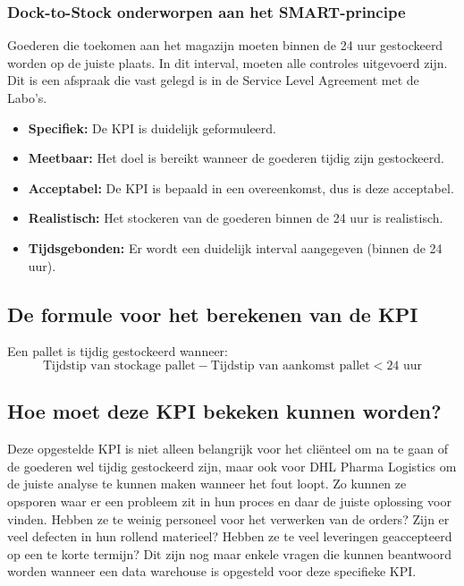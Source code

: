 \subsubsection{Dock-to-Stock onderworpen aan het SMART-principe}
Goederen die toekomen aan het magazijn moeten binnen de 24 uur gestockeerd worden op de juiste plaats. In dit interval, moeten alle controles uitgevoerd zijn. Dit is een afspraak die vast gelegd is in de Service Level Agreement met de Labo's.

\begin{itemize}
	\item \textbf{Specifiek: } De KPI is duidelijk geformuleerd.
	\item \textbf{Meetbaar: } Het doel is bereikt wanneer de goederen tijdig zijn gestockeerd.
	\item \textbf{Acceptabel:} De KPI is bepaald in een overeenkomst, dus is deze acceptabel.
	\item \textbf{Realistisch: } Het stockeren van de goederen binnen de 24 uur is realistisch.
	\item \textbf{Tijdsgebonden: } Er wordt een duidelijk interval aangegeven (binnen de 24 uur).
\end{itemize} 

\subsection{De formule voor het berekenen van de KPI}
Een pallet is tijdig gestockeerd wanneer:
\begin{equation*}
\text{Tijdstip van stockage pallet} - \text{Tijdstip van aankomst pallet} < \text{24 uur}
\end{equation*}

\subsection{Hoe moet deze KPI bekeken kunnen worden?}
Deze opgestelde KPI is niet alleen belangrijk voor het cliënteel om na te gaan of de goederen wel tijdig gestockeerd zijn, maar ook voor DHL Pharma Logistics om de juiste analyse te kunnen maken wanneer het fout loopt. Zo kunnen ze opsporen waar er een probleem zit in hun proces en daar de juiste oplossing voor vinden. Hebben ze te weinig personeel voor het verwerken van de orders? Zijn er veel defecten in hun rollend materieel? Hebben ze te veel leveringen geaccepteerd op een te korte termijn? Dit zijn nog maar enkele vragen die kunnen beantwoord worden wanneer een data warehouse is opgesteld voor deze specifieke KPI.

